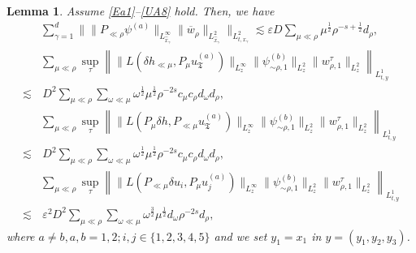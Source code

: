 \documentclass[11pt,letterpaper,reqno]{amsart}
\numberwithin{equation}{section}
\newtheorem{lemma}[theorem]{Lemma}
\theoremstyle{definition}
\theoremstyle{remark}
\begin{document}
\begin{lemma} \label{lem.bi.uni} Assume \eqref{Ea1}--\eqref{UA8} hold. Then, we have
\begin{align}
   &\sum_{\gamma=1}^d  \big \| \| P_{  \ll \rho} \psi^{(a)} \|_{L^\infty_{\widehat{x}_\gamma}} \| 
 \overline{w}_\rho \|_{L^2_{\widehat{x}_\gamma}} \big\|_{L^2_{ t,x_\gamma}} \lesssim \varepsilon D \sum_{\mu\ll \rho}  \mu^{\frac 12} \rho^{-s+\frac 12} d_\rho, \label{pre.uni.bi.es1}\\
& \sum_{\mu\ll\rho}\sup_\tau \left\|\|L(\delta h_{\ll\mu},P_\mu u_{\mathfrak T}^{(a)}) \|_{L^\infty_z}\|\psi_{\sim\rho,1}^{(b)}\|_{L^2_z}
\|w_{\rho,1}^{\tau}\|_{L^2_z}\right\|_{L^1_{t,y}}  \label{pre.uni.bi.es1+1}\\
 \lesssim  &\,   D^2 \sum_{\mu\ll\rho} \sum_{\omega\ll\mu}  
    \omega^{\frac 12}  \mu^{\frac 12}        \rho^{-2s}  c_\mu c_\rho d_{\omega} d_\rho,  \nonumber \\
&\sum_{\mu\ll\rho}
\sup_\tau 
\left\|
\|L(P_\mu\delta h,P_{\ll\mu}u_{\mathfrak T}^{(a)})\|_{L^\infty_z}
\|\psi_{\sim\rho,1}^{(b)}\|_{L^2_z}
\|w_{\rho,1}^{\tau}\|_{L^2_z}
\right\|_{L^1_{t,y}}  \label{pre.uni.bi.es1+2}\\
   \lesssim &  \, D^2 \sum_{\mu\ll\rho} \sum_{\omega\ll\mu}  
    \omega^{\frac 12}  \mu^{\frac 12}        \rho^{-2s}  c_\mu c_\rho d_{\omega} d_\rho, \nonumber \\
&\sum_{\mu\ll\rho}\sup_\tau \left\|\|L( P_{\ll\mu} \delta u_i,P_\mu u_{j}^{(a)}) \|_{L^\infty_z}\|\psi_{\sim\rho,1}^{(b)}\|_{L^2_z}
\|w_{\rho,1}^{\tau}\|_{L^2_z}\right\|_{L^1_{t,y}}  \label{pre.uni.bi.es2.1}\\
 \lesssim  &\,  \varepsilon^2 D^2 \sum_{\mu\ll\rho} \sum_{\omega\ll\mu}
   \omega^{\frac {3} 2} \mu^{\frac 12}   d_{\omega}    \rho^{-2s} d_\rho,  \nonumber
\end{align}
where \(a\neq b, a,b=1,2; i,j\in\{1,2,3,4,5\}\) and we set \(y_1=x_1\) in \(y=(y_1,y_2,y_3)\).
    
\end{lemma}
\end{document}
